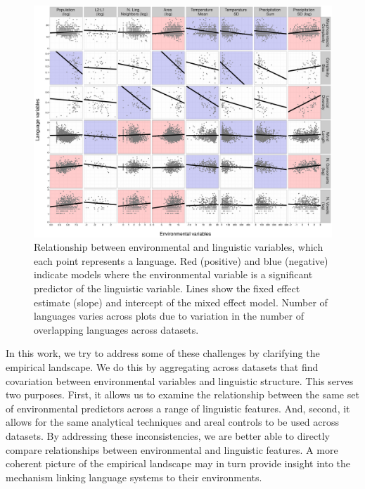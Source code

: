 \documentclass[10pt,letterpaper]{article}
\begin{document}
 \begin{figure}[t]
\begin{center}
\includegraphics[scale = .38]{figs/plot1.pdf}
\end{center}
\vspace{-.5em}
\caption{Relationship between environmental and linguistic variables, which each point represents a language. Red (positive) and blue (negative) indicate models where the environmental variable is a significant predictor of the linguistic variable. Lines show the fixed effect estimate (slope) and  intercept of the mixed effect model. Number of languages varies across plots due to variation in the number of overlapping languages across datasets.}
\label{fig:cbias}
\vspace{-1em}
\end{figure}

In this work, we try to address some of these challenges by clarifying the empirical landscape. We do this by aggregating across datasets that find covariation between environmental variables and linguistic structure. This serves two purposes. First, it allows us to examine the relationship between the same set of environmental predictors across a range of linguistic features. And, second, it allows for the same analytical techniques and areal controls to be used across datasets. By addressing these inconsistencies, we are better able to  directly compare relationships between environmental and linguistic features. A more coherent picture of the empirical landscape may in turn provide insight into the mechanism linking language systems to their environments.
\end{document}
